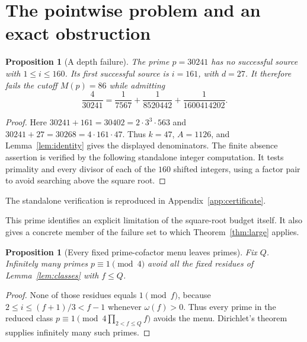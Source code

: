 \documentclass[11pt,a4paper]{amsart}
\newtheorem{proposition}[theorem]{Proposition}
\theoremstyle{definition}\newtheorem{definition}[theorem]{Definition}
\begin{document}


\section{The pointwise problem and an exact obstruction}\label{sec:pointwise}
\begin{proposition}[A depth failure]\label{prop:30241}
The prime $p=30241$ has no successful source with $1\le i\le160$.
Its first successful source is $i=161$, with $d=27$.
It therefore fails the cutoff $M(p)=86$ while admitting
\[
 \frac4{30241}=\frac1{7567}+\frac1{8520442}
                         +\frac1{1600414202}.
\]
\end{proposition}
\begin{proof}
Here $30241+161=30402=2\cdot3^3\cdot563$ and
$30241+27=30268=4\cdot161\cdot47$.
Thus $k=47$, $A=1126$, and Lemma~\ref{lem:identity}
gives the displayed denominators.
The finite absence assertion is verified by the following
standalone integer computation. It tests primality and every
divisor of each of the $160$ shifted integers, using a factor pair
to avoid searching above the square root.
\end{proof}
The standalone verification is reproduced in Appendix~\ref{app:certificate}.

This prime identifies an explicit limitation of the square-root
budget itself. It also gives a concrete member of the failure set
to which Theorem~\ref{thm:large} applies.

\begin{proposition}[Every fixed prime-cofactor menu leaves primes]
Fix $Q$. Infinitely many primes $p\equiv1\pmod4$ avoid
all the fixed residues of Lemma~\ref{lem:classes} with $f\le Q$.
\end{proposition}
\begin{proof}
None of those residues equals $1\pmod f$, because
$2\le i\le(f+1)/3<f-1$ whenever $\omega(f)>0$.
Thus every prime in the reduced class
$p\equiv1\pmod{4\prod_{2<f\le Q}f}$ avoids the menu.
Dirichlet's theorem supplies infinitely many such primes.
\end{proof}
\end{document}
